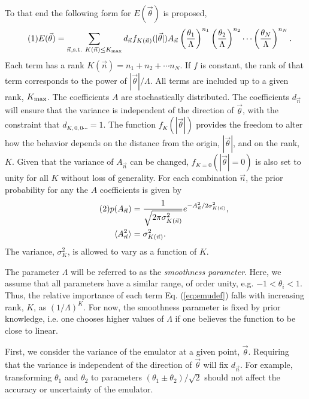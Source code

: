 \documentclass[12pt]{article}
\numberwithin{equation}{section}
\numberwithin{figure}{section}
\newcommand\eqnumber{\addtocounter{equation}{1}\tag{\theequation}}
\begin{document}
To that end the following form for $E(\vec{\theta})$ is proposed,
\begin{align*}\eqnumber\label{eq:emudef}
E(\vec{\theta})&=\sum_{\vec{n}, {\rm s.t.}~K(\vec{n})\le K_{\rm max}} d_{\vec{n}}
f_{K(\vec{n})}(|\vec{\theta}|)
A_{\vec{n}}
\left(\frac{\theta_1}{\Lambda}\right)^{n_1}\left(\frac{\theta_2}{\Lambda}\right)^{n_2}\cdots 
\left(\frac{\theta_N}{\Lambda}\right)^{n_N}.
\end{align*}
Each term has a rank $K(\vec{n})=n_1+n_2+\cdots n_N$. If $f$ is constant, the rank of that term corresponds to the power of $|\vec{\theta}|/\Lambda$. All terms are included up to a given rank, $K_{\rm max}$. The coefficients $A$ are stochastically distributed. The coefficients $d_{\vec{n}}$ will ensure that the variance is independent of the direction of $\vec{\theta}$, with the constraint that $d_{K,0,0\cdots}=1$. The function $f_K(|\vec{\theta}|)$ provides the freedom to alter how the behavior depends on the distance from the origin, $|\vec{\theta}|$, and on the rank, $K$. Given that the variance of $A_{\vec{n}}$ can be changed, $f_{K=0}(|\vec{\theta}|=0)$ is also set to unity for all $K$ without loss of generality. For each combination $\vec{n}$, the prior probability for any the $A$ coefficients is given by 
\begin{align*}\eqnumber
p(A_{\vec{n}})&=\frac{1}{\sqrt{2\pi\sigma^2_{K(\vec{n})}}} e^{-A_{\vec{n}}^2/2\sigma_{K(\vec{n})}^2},\\
\langle A^2_{\vec{n}}\rangle&=\sigma^2_{K(\vec{n})}.
\end{align*}
The variance, $\sigma^2_K$, is allowed to vary as a function of $K$.

The parameter $\Lambda$ will be referred to as the {\it smoothness parameter}. Here, we assume that all parameters have a similar range, of order unity, e.g. $-1<\theta_i<1$. Thus, the relative importance of each term Eq. (\ref{eq:emudef}) falls with increasing rank, $K$, as $(1/\Lambda)^K$. For now, the smoothness parameter is fixed by prior knowledge, i.e. one chooses higher values of $\Lambda$ if one believes the function to be close to linear.

First, we consider the variance of the emulator at a given point, $\vec{\theta}$. Requiring that the variance is independent of the direction of $\vec{\theta}$ will fix $d_{\vec{n}}$.  For example, transforming $\theta_1$ and $\theta_2$ to parameters $(\theta_1\pm\theta_2)/\sqrt{2}$ should not affect the accuracy or uncertainty of the emulator.
\end{document}
